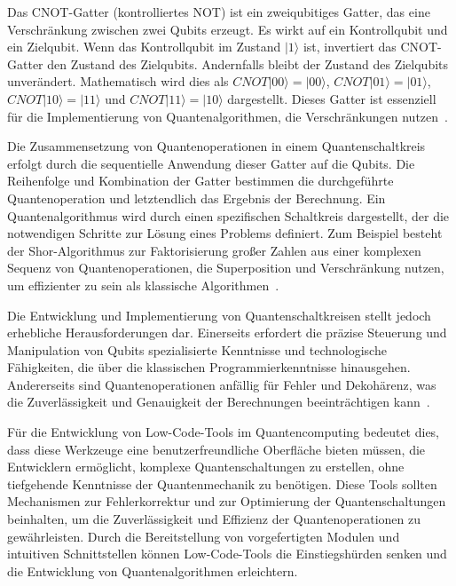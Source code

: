 Das CNOT-Gatter (kontrolliertes NOT) ist ein zweiqubitiges Gatter, das eine Verschränkung 
zwischen zwei Qubits erzeugt. Es wirkt auf ein Kontrollqubit und ein Zielqubit. Wenn das Kontrollqubit 
im Zustand \(|1\rangle\) ist, invertiert das CNOT-Gatter den Zustand des Zielqubits. Andernfalls bleibt 
der Zustand des Zielqubits unverändert. 
Mathematisch wird dies als \( CNOT|00\rangle = |00\rangle \), \( CNOT|01\rangle = |01\rangle \), \( CNOT|10\rangle = |11\rangle \) 
und \( CNOT|11\rangle = |10\rangle \) dargestellt. Dieses Gatter ist essenziell für die Implementierung von 
Quantenalgorithmen, die Verschränkungen nutzen~\cite{feynman2018simulating}.

Die Zusammensetzung von Quantenoperationen in einem Quantenschaltkreis erfolgt durch die sequentielle Anwendung 
dieser Gatter auf die Qubits. Die Reihenfolge und Kombination der Gatter bestimmen die durchgeführte 
Quantenoperation und letztendlich das Ergebnis der Berechnung. Ein Quantenalgorithmus wird durch einen 
spezifischen Schaltkreis dargestellt, der die notwendigen Schritte zur Lösung eines Problems definiert. 
Zum Beispiel besteht der Shor-Algorithmus zur Faktorisierung großer Zahlen aus einer komplexen Sequenz von 
Quantenoperationen, die Superposition und Verschränkung nutzen, um effizienter zu sein als klassische Algorithmen~\cite{shor1999polynomial}.

Die Entwicklung und Implementierung von Quantenschaltkreisen stellt jedoch erhebliche Herausforderungen 
dar. Einerseits erfordert die präzise Steuerung und Manipulation von Qubits spezialisierte Kenntnisse und 
technologische Fähigkeiten, die über die klassischen Programmierkenntnisse hinausgehen. Andererseits sind 
Quantenoperationen anfällig für Fehler und Dekohärenz, was die Zuverlässigkeit und Genauigkeit der 
Berechnungen beeinträchtigen kann~\cite{preskill2018quantum}.

Für die Entwicklung von Low-Code-Tools im Quantencomputing bedeutet dies, dass diese Werkzeuge eine 
benutzerfreundliche Oberfläche bieten müssen, die Entwicklern ermöglicht, komplexe Quantenschaltungen 
zu erstellen, ohne tiefgehende Kenntnisse der Quantenmechanik zu benötigen. Diese Tools sollten Mechanismen 
zur Fehlerkorrektur und zur Optimierung der Quantenschaltungen beinhalten, um die Zuverlässigkeit und 
Effizienz der Quantenoperationen zu gewährleisten. Durch die Bereitstellung von vorgefertigten Modulen 
und intuitiven Schnittstellen können Low-Code-Tools die Einstiegshürden senken und die Entwicklung von 
Quantenalgorithmen erleichtern.

